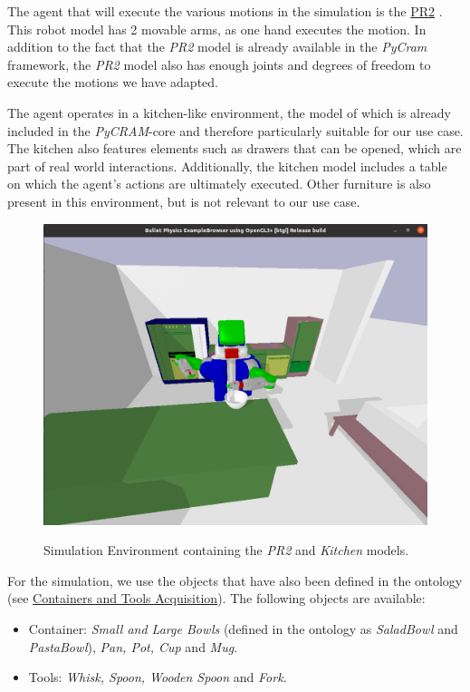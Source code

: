 The agent that will execute the various motions in the simulation is the \hyperref[sec:pr2]{PR2} \cite{pr2}.
This robot model has 2 movable arms, as one hand executes the motion. In addition to the fact that the \textit{PR2} \cite{pr2} model is already available in the \textit{PyCram} \cite{pycram} framework,
the \textit{PR2} \cite{pr2} model also has enough joints and degrees of freedom to execute the motions we have adapted.

The agent operates in a kitchen-like environment, the model of which is already included in the \textit{PyCRAM}-core \cite{pycram} and therefore particularly suitable for our use case. The kitchen also features elements such as drawers that can be opened, which are part of real world interactions. Additionally, the kitchen model includes a table on which the agent's actions are ultimately executed. Other furniture is also present in this environment, but is not relevant to our use case.

\begin{figure}[H]
    \includegraphics[scale=0.35]{Graphics/bulletworldexample.png}
    \label{fig:bulletworldexample}
    \caption{Simulation Environment containing the \textit{PR2} and \textit{Kitchen} models. }
\end{figure}

For the simulation, we use the objects that have also been defined in the ontology (see \hyperref[sec:ContainersAndToolsAcquisition]{Containers and Tools Acquisition}).
The following objects are available:
\begin{itemize}
	\item Container: \textit{Small and Large Bowls} (defined in the ontology as \textit{SaladBowl} and \textit{PastaBowl}), \textit{Pan, Pot, Cup} and \textit{Mug}.
	\item Tools: \textit{Whisk, Spoon, Wooden Spoon} and \textit{Fork}.
\end{itemize}

